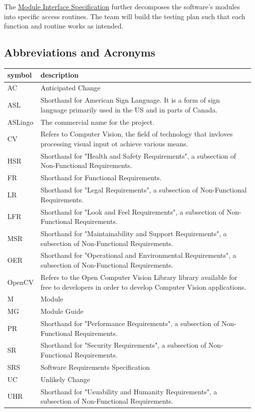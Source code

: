 \documentclass[12pt, titlepage]{article}
\begin{document}
\noindent The \href{https://github.com/stanreee/sign-language-learning/blob/main/docs/Design/SoftDetailedDes/MIS.pdf}{Module Interface Specification} further decomposes the software's modules into specific access routines. The team will build the testing plan such that each function and routine works as intended.

\subsection{Abbreviations and Acronyms}

\renewcommand{\arraystretch}{1.2}
\begin{tabular}{|p{3cm}|p{13cm}|} 
  \toprule		
  \textbf{symbol} & \textbf{description}\\
  \midrule 
  AC & Anticipated Change\\
  ASL & Shorthand for American Sign Language. It is a form of sign language primarily used in the US and in parts of Canada. \\
  ASLingo & The commercial name for the project. \\
  CV & Refers to Computer Vision, the field of technology that invloves processing visual input ot achieve various means. \\
  HSR & Shorthand for "Health and Safety Requirements", a subsection of Non-Functional Requirements. \\
  FR & Shorthand for Functional Requirements. \\
  LR & Shorthand for "Legal Requirements", a subsection of Non-Functional Requirements. \\
  LFR & Shorthand for "Look and Feel Requirements", a subsection of Non-Functional Requirements. \\
  MSR & Shorthand for "Maintainability and Support Requirements", a subsection of Non-Functional Requirements. \\
  OER & Shorthand for "Operational and Environmental Requirements", a subsection of Non-Functional Requirements. \\
  OpenCV & Refers to the Open Computer Vision Library library available for free to developers in order to develop Computer Vision applications. \\
  M & Module \\
  MG & Module Guide \\
  PR & Shorthand for "Performance Requirements", a subsection of Non-Functional Requirements. \\
  SR & Shorthand for "Security Requirements", a subsection of Non-Functional Requirements. \\
  SRS & Software Requirements Specification\\
  UC & Unlikely Change \\
  UHR & Shorthand for "Usuability and Humanity Requirements", a subsection of Non-Functional Requirements. \\
  \bottomrule
\end{tabular}\\
\end{document}
